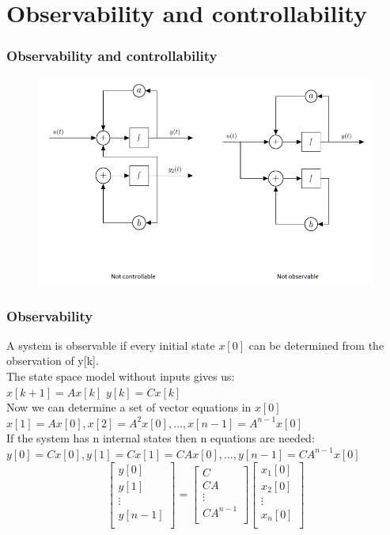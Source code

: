 \section{Observability and controllability}
\begin{frame}
	\frametitle{Observability and controllability}
	\begin{figure}
	\centering
	\includegraphics[width=0.7\linewidth]{Images/discrete_time_systems_34}
\end{figure}
\end{frame}
\begin{frame}
	\frametitle{Observability}
	\small{
	A system is observable if every initial state $x[0]$ can be determined from the observation of y[k].\\
	The state space model without inputs gives us:\\
	$x[k+1] = A x[k] $ \quad \quad				$y[k]=Cx[k]$\\
	Now we can determine a set of vector equations in $x[0]$\\
	$x[1] = A x[0],x[2]  = A^2x[0],\dots , x[n-1] = A^{n-1} x[0]$\\
	If the system has n internal states then n equations are needed:\\
	$y[0] =Cx[0],y[1]=Cx[1]=CAx[0],\dots, y[n-1] = C A^{n-1} x[0]$\\
	\[
	\begin{bmatrix}
		y[0]\\
		y[1]\\
		\vdots \\
		y[n-1]\\
	\end{bmatrix} = 
	\begin{bmatrix}
	C\\
	CA\\
	\vdots\\
	CA^{n-1}\\
	\end{bmatrix} \begin{bmatrix}
	x_1[0]\\
	x_2[0]\\
	\vdots\\
	x_n[0]\\
	\end{bmatrix}
	\]}
\end{frame}
